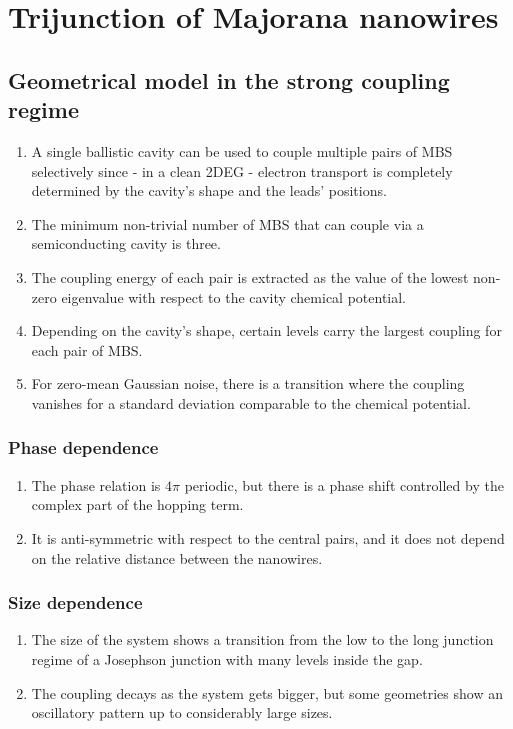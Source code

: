 \chapter{Trijunction of Majorana nanowires}

\section{Geometrical model in the strong coupling regime}

\begin{enumerate}
\item A single ballistic cavity can be used to couple multiple pairs of MBS selectively since - in a clean 2DEG - electron transport is completely determined by the cavity's shape and the leads' positions.
\item The minimum non-trivial number of MBS that can couple via a semiconducting cavity is three.
\item The coupling energy of each pair is extracted as the value of the lowest non-zero eigenvalue with respect to the cavity chemical potential.
\item Depending on the cavity's shape, certain levels carry the largest coupling for each pair of MBS.
\item For zero-mean Gaussian noise, there is a transition where the coupling vanishes for a standard deviation comparable to the chemical potential.
\end{enumerate}

\subsection{Phase dependence}
\begin{enumerate}
\item The phase relation is $4\pi$ periodic, but there is a phase shift controlled by the complex part of the hopping term.
\item It is anti-symmetric with respect to the central pairs, and it does not depend on the relative distance between the nanowires.
\end{enumerate}

\subsection{Size dependence}
\begin{enumerate}
\item The size of the system shows a transition from the low to the long junction regime of a Josephson junction with many levels inside the gap.
\item The coupling decays as the system gets bigger, but some geometries show an oscillatory pattern up to considerably large sizes.
\end{enumerate}



